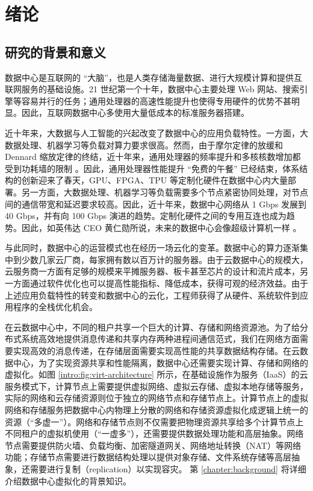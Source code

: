\chapter{绪论}
\label{chapter:intro}

\section{研究的背景和意义}


数据中心是互联网的 ``大脑''，也是人类存储海量数据、进行大规模计算和提供互联网服务的基础设施。21 世纪第一个十年，数据中心主要处理 Web 网站、搜索引擎等容易并行的任务；通用处理器的高速性能提升也使得专用硬件的优势不甚明显。因此，互联网数据中心多使用大量低成本的标准服务器搭建。

近十年来，大数据与人工智能的兴起改变了数据中心的应用负载特性。一方面，大数据处理、机器学习等负载对算力要求很高。然而，由于摩尔定律的放缓和 Dennard 缩放定律的终结，近十年来，通用处理器的频率提升和多核核数增加都受到功耗墙的限制 \cite{borkar2011future}。因此，通用处理器性能提升 ``免费的午餐'' 已经结束，体系结构的创新迎来了春天，GPU、FPGA、TPU \cite{jouppi2018motivation} 等定制化硬件在数据中心内大量部署。另一方面，大数据处理、机器学习等负载需要多个节点紧密协同处理，对节点间的通信带宽和延迟要求较高。因此，近十年来，数据中心网络从 1 Gbps 发展到 40 Gbps，并有向 100 Gbps 演进的趋势。定制化硬件之间的专用互连也成为趋势。因此，如英伟达 CEO 黄仁勋所说，未来的数据中心会像超级计算机一样 \cite{nvidia-datacenter}。

与此同时，数据中心的运营模式也在经历一场云化的变革。数据中心的算力逐渐集中到少数几家云厂商，每家拥有数以百万计的服务器。由于云数据中心的规模大，云服务商一方面有足够的规模来平摊服务器、板卡甚至芯片的设计和流片成本，另一方面通过软件优化也可以提高性能指标、降低成本，获得可观的经济效益。由于上述应用负载特性的转变和数据中心的云化，工程师获得了从硬件、系统软件到应用程序的全栈优化机会。

在云数据中心中，不同的租户共享一个巨大的计算、存储和网络资源池。为了给分布式系统高效地提供消息传递和共享内存两种进程间通信范式，我们在网络方面需要实现高效的消息传递，在存储层面需要实现高性能的共享数据结构存储。在云数据中心，为了实现资源共享和性能隔离，数据中心还需要实现计算、存储和网络的虚拟化。如图 \ref{intro:fig:virt-architecture} 所示，在基础设施作为服务（IaaS）的云服务模式下，计算节点上需要提供虚拟网络、虚拟云存储、虚拟本地存储等服务，实际的网络和云存储资源则位于独立的网络节点和存储节点上。计算节点上的虚拟网络和存储服务把数据中心内物理上分散的网络和存储资源虚拟化成逻辑上统一的资源（``多虚一''）。网络和存储节点则不仅需要把物理资源共享给多个计算节点上不同租户的虚拟机使用（``一虚多''），还需要提供数据处理功能和高层抽象。网络节点需要提供防火墙、负载均衡、加密隧道网关、网络地址转换（NAT）等网络功能；存储节点需要进行数据结构处理以提供对象存储、文件系统存储等高层抽象，还需要进行复制（replication）以实现容灾。
第 \ref{chapter:background} 将详细介绍数据中心虚拟化的背景知识。


